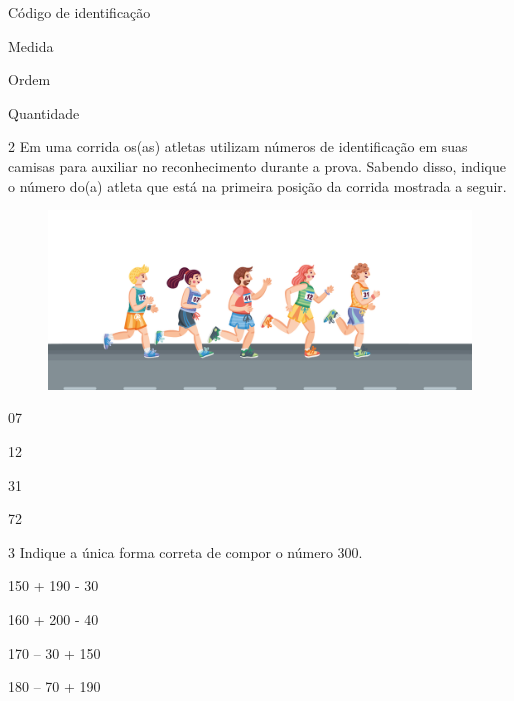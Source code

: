 \begin{escolha}
\item Código de identificação

\item Medida

\item Ordem

\item Quantidade
\end{escolha}


\num{2} Em uma corrida os(as) atletas utilizam números de identificação em suas
camisas para auxiliar no reconhecimento durante a prova. Sabendo disso,
indique o número do(a) atleta que está na primeira posição da corrida
mostrada a seguir.

\begin{figure}[htpb!]
\includegraphics[width=\textwidth]{./media/image138.png}
\end{figure}

\begin{escolha}
\item 07

\item 12

\item 31

\item 72
\end{escolha}

\num{3} Indique a única forma correta de compor o número 300.

\begin{escolha}
\item 150 + 190 - 30

\item 160 + 200 - 40

\item 170 -- 30 + 150

\item 180 -- 70 + 190
\end{escolha}


